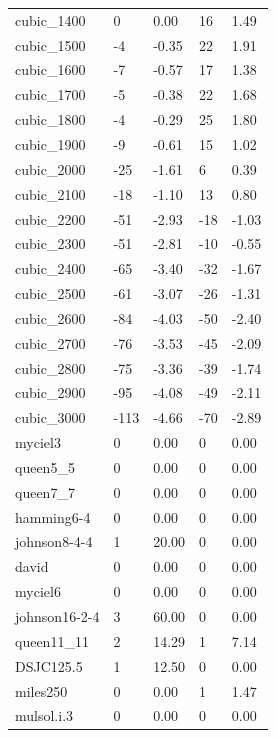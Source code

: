 \begin{table}[h!]
{\begin{tabular}{lllll}
            cubic\_1400 & 0 & 0.00 & 16 & 1.49 \\
            cubic\_1500 & -4 & -0.35 & 22 & 1.91 \\
            cubic\_1600 & -7 & -0.57 & 17 & 1.38 \\
            cubic\_1700 & -5 & -0.38 & 22 & 1.68 \\
            cubic\_1800 & -4 & -0.29 & 25 & 1.80 \\
            cubic\_1900 & -9 & -0.61 & 15 & 1.02 \\
            cubic\_2000 & -25 & -1.61 & 6 & 0.39 \\
            cubic\_2100 & -18 & -1.10 & 13 & 0.80 \\
            cubic\_2200 & -51 & -2.93 & -18 & -1.03 \\
            cubic\_2300 & -51 & -2.81 & -10 & -0.55 \\
            cubic\_2400 & -65 & -3.40 & -32 & -1.67 \\
            cubic\_2500 & -61 & -3.07 & -26 & -1.31 \\
            cubic\_2600 & -84 & -4.03 & -50 & -2.40 \\
            cubic\_2700 & -76 & -3.53 & -45 & -2.09 \\
            cubic\_2800 & -75 & -3.36 & -39 & -1.74 \\
            cubic\_2900 & -95 & -4.08 & -49 & -2.11 \\
            cubic\_3000 & -113 & -4.66 & -70 & -2.89 \\
            myciel3 & 0 & 0.00 & 0 & 0.00 \\
            queen5\_5 & 0 & 0.00 & 0 & 0.00 \\
            queen7\_7 & 0 & 0.00 & 0 & 0.00 \\
            hamming6-4 & 0 & 0.00 & 0 & 0.00 \\
            johnson8-4-4 & 1 & 20.00 & 0 & 0.00 \\
            david & 0 & 0.00 & 0 & 0.00 \\
            myciel6 & 0 & 0.00 & 0 & 0.00 \\
            johnson16-2-4 & 3 & 60.00 & 0 & 0.00 \\
            queen11\_11 & 2 & 14.29 & 1 & 7.14 \\
            DSJC125.5 & 1 & 12.50 & 0 & 0.00 \\
            miles250 & 0 & 0.00 & 1 & 1.47 \\
            mulsol.i.3 & 0 & 0.00 & 0 & 0.00 \\

\end{tabular}}
\end{table}
